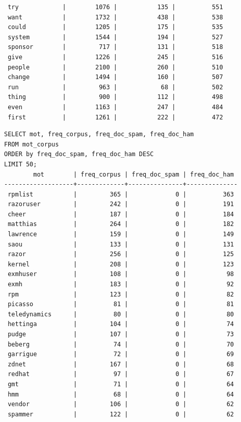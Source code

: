 \documentclass[a4paper,12pt]{article}
\begin{document}
\begin{verbatim}
 try            |        1076 |           135 |          551
 want           |        1732 |           438 |          538
 could          |        1205 |           175 |          535
 system         |        1544 |           194 |          527
 sponsor        |         717 |           131 |          518
 give           |        1226 |           245 |          516
 people         |        2100 |           260 |          510
 change         |        1494 |           160 |          507
 run            |         963 |            68 |          502
 thing          |         900 |           112 |          498
 even           |        1163 |           247 |          484
 first          |        1261 |           222 |          472
	\end{verbatim}

	\begin{verbatim}
SELECT mot, freq_corpus, freq_doc_spam, freq_doc_ham 
FROM mot_corpus
ORDER by freq_doc_spam, freq_doc_ham DESC
LIMIT 50;
        mot        | freq_corpus | freq_doc_spam | freq_doc_ham 
-------------------+-------------+---------------+--------------
 rpmlist           |         365 |             0 |          363
 razoruser         |         242 |             0 |          191
 cheer             |         187 |             0 |          184
 matthias          |         264 |             0 |          182
 lawrence          |         159 |             0 |          149
 saou              |         133 |             0 |          131
 razor             |         256 |             0 |          125
 kernel            |         208 |             0 |          123
 exmhuser          |         108 |             0 |           98
 exmh              |         183 |             0 |           92
 rpm               |         123 |             0 |           82
 picasso           |          81 |             0 |           81
 teledynamics      |          80 |             0 |           80
 hettinga          |         104 |             0 |           74
 pudge             |         107 |             0 |           73
 beberg            |          74 |             0 |           70
 garrigue          |          72 |             0 |           69
 zdnet             |         167 |             0 |           68
 redhat            |          97 |             0 |           67
 gmt               |          71 |             0 |           64
 hmm               |          68 |             0 |           64
 vendor            |         106 |             0 |           62
 spammer           |         122 |             0 |           62

\end{verbatim}
\end{document}
